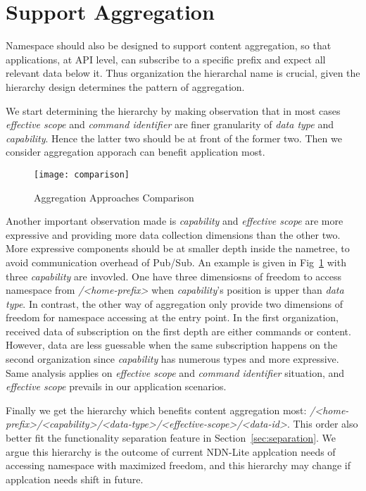 \section{Support Aggregation}
\label{sec:data-aggregation}
Namespace should also be designed to support content aggregation, so that applications, at API level, can subscribe to a specific prefix and expect all relevant data below it.
Thus organization the hierarchal name is crucial, given the hierarchy design determines the pattern of aggregation.  

We start determining the hierarchy by making observation that in most cases \textit{effective scope} and \textit{command identifier} are finer granularity of \textit{data type} and \textit{capability}.
Hence the latter two should be at front of the former two.
Then we consider aggregation apporach can benefit application most. 

\begin{figure}[!h]
    \centering
    \texttt{[image: comparison]}
    \caption{Aggregation Approaches Comparison}
    \label{fig:aggregation-comparison}
\end{figure}

Another important observation made is \textit{capability} and \textit{effective scope} are more expressive and providing more data collection dimensions than the other two.
More expressive components should be at smaller depth inside the nametree, to avoid communication overhead of Pub/Sub.
An example is given in Fig~\ref{fig:aggregation-comparison} with three \textit{capability} are invovled. 
One have three dimensiosns of freedom to access namespace from \textsl{/<home-prefix>} when \textit{capability}'s position is upper than \textit{data type}.
In contrast, the other way of aggregation only provide two dimensions of freedom for namespace accessing at the entry point.
In the first organization, received data of subscription on the first depth are either commands or content.
However, data are less guessable when the same subscription happens on the second organization since \textit{capability} has numerous types and more expressive.
Same analysis applies on \textit{effective scope} and \textit{command identifier} situation, and \textit{effective scope} prevails in our application scenarios.

Finally we get the hierarchy which benefits content aggregation most: \textsl{/<home-prefix>/<capability>/<data-type>/<effective-scope>/<data-id>}.
This order also better fit the functionality separation feature in Section~\ref{sec:separation}.
We argue this hierarchy is the outcome of current NDN-Lite applcation needs of accessing namespace with maximized freedom, and this hierarchy may change if applcation needs shift in future.